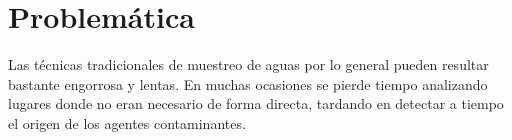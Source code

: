 \section{Problem\'atica} 

Las t\'ecnicas tradicionales de muestreo de aguas por lo general pueden resultar bastante engorrosa y lentas. En muchas ocasiones se pierde tiempo analizando lugares donde no eran necesario de forma directa, tardando en detectar a tiempo el origen de los agentes contaminantes. 

